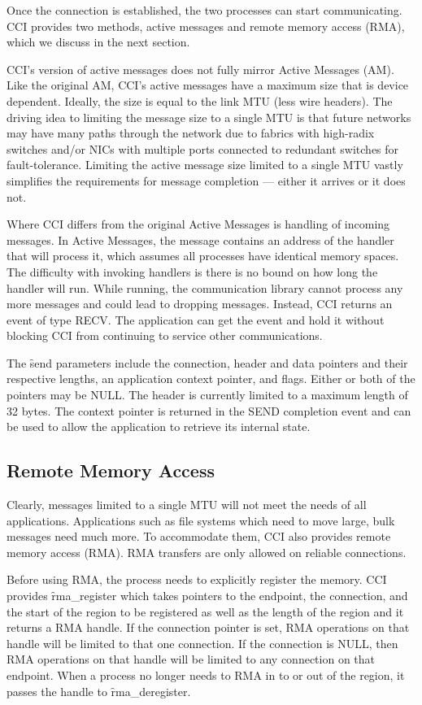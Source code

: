 \documentclass[conference]{IEEEtran}
\begin{document}
Once the connection is established, the two processes can start communicating. CCI
provides two methods, active messages and remote memory access (RMA), which we discuss in
the next section.

CCI's version of active messages does not fully mirror Active Messages\cite{am} (AM). Like
the original AM, CCI's active messages have a maximum size that is device dependent.
Ideally, the size is equal to the link MTU (less wire headers). The driving idea to
limiting the message size to a single MTU is that future networks may have many paths
through the network due to fabrics with high-radix switches and/or NICs with multiple
ports connected to redundant switches for fault-tolerance.  Limiting the active message
size limited to a single MTU vastly simplifies the requirements for message completion ---
either it arrives or it does not.

Where CCI differs from the original Active Messages is handling of incoming messages.  In
Active Messages, the message contains an address of the handler that will process it,
which assumes all processes have identical memory spaces.  The difficulty with invoking
handlers is there is no bound on how long the handler will run.  While running, the
communication library cannot process any more messages and could lead to dropping
messages. Instead, CCI returns an event of type RECV. The application can get the event
and hold it without blocking CCI from continuing to service other communications.

The \f{send} parameters include the connection, header and data pointers and their
respective lengths, an application context pointer, and flags. Either or both of the
pointers may be NULL. The header is currently limited to a maximum length of 32 bytes. The
context pointer is returned in the SEND completion event and can be used to allow the
application to retrieve its internal state.


\subsection{Remote Memory Access}
Clearly, messages limited to a single MTU will not meet the needs of all applications.
Applications such as file systems which need to move large, bulk messages need much more.
To accommodate them, CCI also provides remote memory access (RMA). RMA transfers are only
allowed on reliable connections.

Before using RMA, the process needs to explicitly register the memory. CCI provides
\f{rma\_register} which takes pointers to the endpoint, the connection, and the start of
the region to be registered as well as the length of the region and it returns a RMA
handle. If the connection pointer is set, RMA operations on that handle will be limited to
that one connection. If the connection is NULL, then RMA operations on that handle will be
limited to any connection on that endpoint.  When a process no longer needs to RMA in to
or out of the region, it passes the handle to \f{rma\_deregister}.
\end{document}
